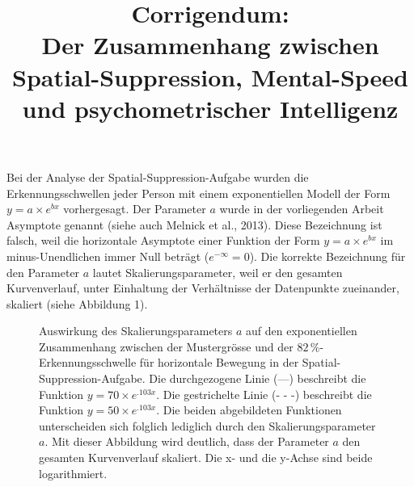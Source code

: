 \documentclass[11pt,a4paper]{article}
\date{}
\title{\textbf{Corrigendum}:\\Der Zusammenhang zwischen Spatial-Suppression, Mental-Speed und psychometrischer Intelligenz}
\begin{document}
	\maketitle
	\thispagestyle{empty}

	\noindent Bei der Analyse der Spatial-Suppression-Aufgabe wurden die Erkennungsschwellen jeder Person mit einem exponentiellen Modell der Form $y=a \times e^{bx}$ vorhergesagt. Der Parameter $a$ wurde in der vorliegenden Arbeit Asymptote genannt (siehe auch Melnick et al., 2013).
	Diese Bezeichnung ist falsch, weil die horizontale Asymptote einer Funktion der Form $y=a \times e^{bx}$ im minus-Unendlichen immer Null beträgt ($e^{-\infty}=0$). Die korrekte Bezeichnung für den Parameter $a$ lautet Skalierungsparameter, weil er den gesamten Kurvenverlauf, unter Einhaltung der Verhältnisse der Datenpunkte zueinander, skaliert (siehe Abbildung 1).
	
	\begin{figure}[h]
		\centering
		\begin{adjustbox}{width=.91\textwidth}
			
		\end{adjustbox}
		\caption[]{Auswirkung des Skalierungsparameters $a$ auf den exponentiellen Zusammenhang zwischen der Mustergrösse und der $82\,\%$-Er\-ken\-nungs\-schwel\-le für horizontale Bewegung in der Spatial-Suppression-Aufgabe. Die durchgezogene Linie (---) beschreibt die Funktion $y=70 \times e^{.103x}$. Die gestrichelte Linie (- - -) beschreibt die Funktion $y=50 \times e^{.103x}$. Die beiden abgebildeten Funktionen unterscheiden sich folglich lediglich durch den Skalierungsparameter $a$. Mit dieser Abbildung wird deutlich, dass der Parameter $a$ den gesamten Kurvenverlauf skaliert. Die x- und die y-Achse sind beide logarithmiert.}
		\label{fig:scale}
	\end{figure}
\end{document}
